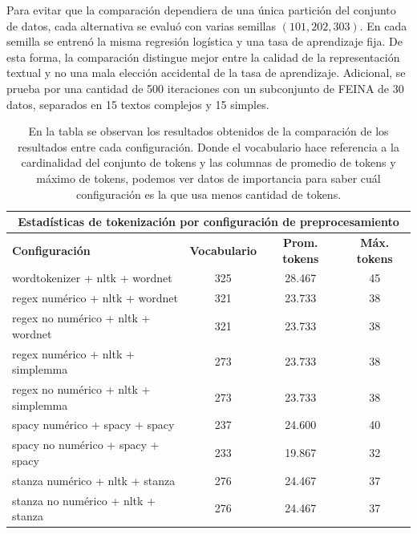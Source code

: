 \documentclass[12pt]{article}
\begin{document}
Para evitar que la comparación dependiera de una única partición del conjunto de datos, cada alternativa se evaluó con varias semillas $(101, 202, 303)$. En cada semilla se entrenó la misma regresión logística y una tasa de aprendizaje fija. De esta forma, la comparación distingue mejor entre la calidad de la representación textual y no una mala elección accidental de la tasa de aprendizaje. Adicional, se prueba por una cantidad de 500 iteraciones con un subconjunto de FEINA de 30 datos, separados en 15 textos complejos y 15 simples.

\begin{table}[H]
\centering
\begin{tabular}{lccc}
\multicolumn{4}{c}{Estadísticas de tokenización por configuración de preprocesamiento} \\
\toprule
\textbf{Configuración} & \textbf{Vocabulario} & \textbf{Prom. tokens} & \textbf{Máx. tokens} \\
\midrule
wordtokenizer + nltk + wordnet & 325 & 28.467 & 45 \\
regex numérico + nltk + wordnet & 321 & 23.733 & 38 \\
regex no numérico + nltk + wordnet & 321 & 23.733 & 38 \\
regex numérico + nltk + simplemma & 273 & 23.733 & 38 \\
regex no numérico + nltk + simplemma & 273 & 23.733 & 38 \\
spacy numérico + spacy + spacy & 237 & 24.600 & 40 \\
spacy no numérico + spacy + spacy & 233 & 19.867 & 32 \\
stanza numérico + nltk + stanza & 276 & 24.467 & 37 \\
stanza no numérico + nltk + stanza & 276 & 24.467 & 37 \\
\bottomrule
\end{tabular}
\caption{En la tabla se observan los resultados obtenidos de la comparación de los resultados entre cada configuración. Donde el vocabulario hace referencia a la cardinalidad del conjunto de tokens y las columnas de promedio de tokens y máximo de tokens, podemos ver datos de importancia para saber cuál configuración es la que usa menos cantidad de tokens.}
\end{table}
\end{document}
